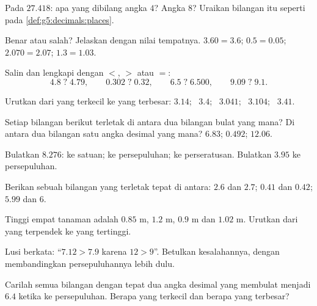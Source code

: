 \begin{exercise}[$\star$]\label{exo:g5:decimals:2}
Pada $27.418$: apa yang dibilang angka $4$? Angka $8$? Uraikan
bilangan itu seperti pada \cref{def:g5:decimals:places}.
\end{exercise}

\begin{exercise}[$\star$]\label{exo:g5:decimals:3}
Benar atau salah? Jelaskan dengan nilai tempatnya.
$3.60 = 3.6$; \quad $0.5 = 0.05$; \quad $2.070 = 2.07$; \quad
$1.3 = 1.03$.
\end{exercise}

\begin{exercise}[$\star$]\label{exo:g5:decimals:4}
Salin dan lengkapi dengan $<$, $>$ atau $=$:
\[
4.8 \;?\; 4.79, \qquad
0.302 \;?\; 0.32, \qquad
6.5 \;?\; 6.500, \qquad
9.09 \;?\; 9.1 .
\]
\end{exercise}

\begin{exercise}[$\star$]\label{exo:g5:decimals:5}
Urutkan dari yang terkecil ke yang terbesar: $3.14$; \ $3.4$; \ $3.041$; \
$3.104$; \ $3.41$.
\end{exercise}

\begin{exercise}[$\star$]\label{exo:g5:decimals:6}
Setiap bilangan berikut terletak di antara dua bilangan bulat yang
mana? Di antara dua bilangan satu angka desimal yang mana? \quad
$6.83$; \quad $0.492$; \quad $12.06$.
\end{exercise}

\begin{exercise}[$\star$]\label{exo:g5:decimals:7}
Bulatkan $8.276$: ke satuan; ke persepuluhan; ke perseratusan.
Bulatkan $3.95$ ke persepuluhan.
\end{exercise}

\begin{exercise}[$\star$]\label{exo:g5:decimals:8}
Berikan sebuah bilangan yang terletak tepat di antara: $2.6$ dan
$2.7$; \quad $0.41$ dan $0.42$; \quad $5.99$ dan $6$.
\end{exercise}

\begin{exercise}[$\star$]\label{exo:g5:decimals:9}
Tinggi empat tanaman adalah $0.85$ m, $1.2$ m, $0.9$ m dan $1.02$ m.
Urutkan dari yang terpendek ke yang tertinggi.
\end{exercise}

\begin{exercise}[$\star\star$]\label{exo:g5:decimals:10}
Lusi berkata: ``$7.12 > 7.9$ karena $12 > 9$''. Betulkan
kesalahannya, dengan membandingkan persepuluhannya lebih dulu.
\end{exercise}

\begin{exercise}[$\star\star$]\label{exo:g5:decimals:11}
Carilah semua bilangan dengan tepat dua angka desimal yang membulat
menjadi $6.4$ ketika \omterm{def:g4:numbers:round}{dibulatkan} ke persepuluhan. Berapa yang
terkecil dan berapa yang terbesar?

\end{exercise}
